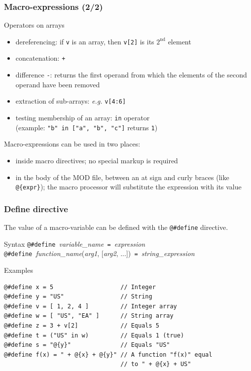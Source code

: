 \documentclass{beamer}
\begin{document}
\begin{frame}[fragile=singleslide]
  \frametitle{Macro-expressions (2/2)}
  \begin{block}{Operators on arrays}
    \begin{itemize}
    \item dereferencing: if \texttt{v} is an array, then \texttt{v[2]} is its $2^{\textrm{nd}}$ element
    \item concatenation: \texttt{+}
    \item difference \texttt{-}: returns the first operand from which the elements of the second operand have been removed
    \item extraction of sub-arrays: \textit{e.g.} \texttt{v[4:6]}
    \item testing membership of an array: \texttt{in} operator \\ (example:
      \texttt{"b" in ["a", "b", "c"]} returns \texttt{1})
    \end{itemize}
  \end{block}

  Macro-expressions can be used in two places:
  \begin{itemize}
  \item inside macro directives; no special markup is required
  \item in the body of the MOD file, between an at sign and curly braces (like \verb+@{expr}+); the macro processor will substitute the expression with its value
  \end{itemize}
\end{frame}

\begin{frame}[fragile=singleslide]
  \frametitle{Define directive}

  The value of a macro-variable can be defined with the \verb+@#define+ directive.

  \begin{block}{Syntax}
    \verb+@#define +\textit{variable\_name}\verb+ = +\textit{expression}\\
    \verb+@#define +\textit{function\_name}(\textit{arg1}, [\textit{arg2}, ...])\verb+ = +\textit{string\_expression}
  \end{block}

  \begin{block}{Examples}
\begin{verbatim}
@#define x = 5                   // Integer
@#define y = "US"                // String
@#define v = [ 1, 2, 4 ]         // Integer array
@#define w = [ "US", "EA" ]      // String array
@#define z = 3 + v[2]            // Equals 5
@#define t = ("US" in w)         // Equals 1 (true)
@#define s = "@{y}"              // Equals "US"
@#define f(x) = " + @{x} + @{y}" // A function "f(x)" equal
                                 // to " + @{x} + US"
\end{verbatim}
  \end{block}
\end{frame}
\end{document}
